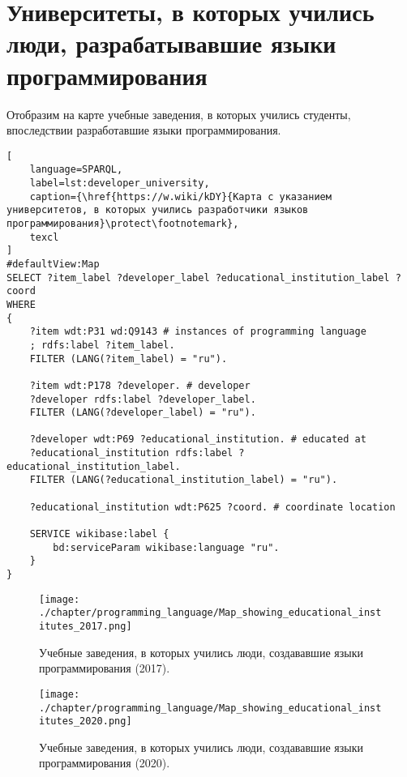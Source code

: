 \section{Университеты, в которых учились люди, разрабатывавшие языки программирования}
Отобразим на карте учебные заведения, в которых учились студенты, впоследствии разработавшие языки программирования.

\begin{lstlisting}[
	language=SPARQL,
	label=lst:developer_university,
	caption={\href{https://w.wiki/kDY}{Карта с указанием университетов, в которых учились разработчики языков программирования}\protect\footnotemark},
	texcl
]
#defaultView:Map
SELECT ?item_label ?developer_label ?educational_institution_label ?coord
WHERE
{
    ?item wdt:P31 wd:Q9143 # instances of programming language
    ; rdfs:label ?item_label. 
    FILTER (LANG(?item_label) = "ru"). 
    
    ?item wdt:P178 ?developer. # developer
    ?developer rdfs:label ?developer_label. 
    FILTER (LANG(?developer_label) = "ru"). 
    	
    ?developer wdt:P69 ?educational_institution. # educated at
    ?educational_institution rdfs:label ?educational_institution_label. 
    FILTER (LANG(?educational_institution_label) = "ru").
    
    ?educational_institution wdt:P625 ?coord. # coordinate location
    
    SERVICE wikibase:label {
        bd:serviceParam wikibase:language "ru".
    } 	
}
\end{lstlisting}

\begin{figure}[h]
\centering
	\texttt{[image: ./chapter/programming\_language/Map\_showing\_educational\_institutes\_2017.png]}
	\caption{Учебные заведения, в которых учились люди, создававшие языки программирования (2017).}
	\label{fig:universities_2017}
\end{figure}
\begin{figure}[h]
\centering
	\texttt{[image: ./chapter/programming\_language/Map\_showing\_educational\_institutes\_2020.png]}
	\caption{Учебные заведения, в которых учились люди, создававшие языки программирования (2020).}
	\label{fig:universities_2020}
\end{figure}


